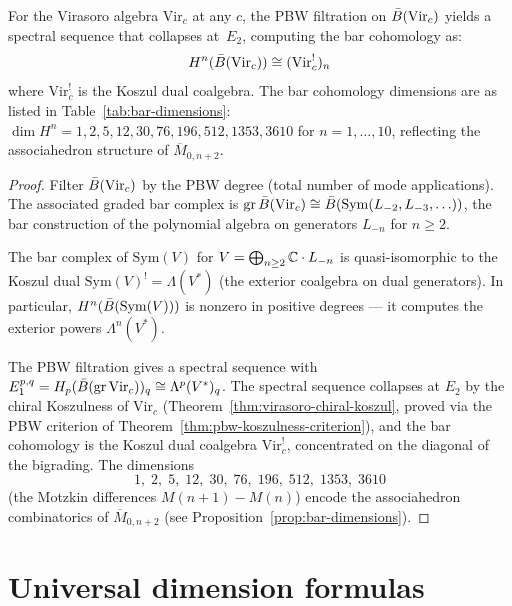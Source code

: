\begin{proposition}
\label{prop:virasoro-koszul-acyclic}
For the Virasoro algebra $\mathrm{Vir}_c$ at any $c$, the PBW filtration
on $\bar{B}(\mathrm{Vir}_c)$ yields a spectral sequence that collapses
at~$E_2$, computing the bar cohomology as:
\begin{equation}\label{eq:virasoro-koszul-acyclic}
H^n(\bar{B}(\mathrm{Vir}_c)) \cong (\mathrm{Vir}_c^!)_n
\end{equation}
where $\mathrm{Vir}_c^!$ is the Koszul dual coalgebra.
The bar cohomology dimensions are as listed in
Table~\textup{\ref{tab:bar-dimensions}}:
$\dim H^n = 1, 2, 5, 12, 30, 76, 196, 512, 1353, 3610$ for $n = 1, \ldots, 10$,
reflecting the associahedron structure of
$\overline{M}_{0,n+2}$.
\end{proposition}

\begin{proof}
Filter $\bar{B}(\mathrm{Vir}_c)$ by the PBW degree (total number
of mode applications).  The associated graded bar complex is
$\mathrm{gr}\,\bar{B}(\mathrm{Vir}_c)
\cong \bar{B}(\mathrm{Sym}(L_{-2}, L_{-3}, \ldots))$,
the bar construction of the polynomial algebra on generators
$L_{-n}$ for $n \geq 2$.

The bar complex of $\mathrm{Sym}(V)$ for $V = \bigoplus_{n \geq 2}
\mathbb{C} \cdot L_{-n}$ is quasi-isomorphic to the Koszul dual
$\mathrm{Sym}(V)^! = \Lambda(V^*)$ (the exterior coalgebra on dual
generators).  In particular, $H^n(\bar{B}(\mathrm{Sym}(V)))$ is nonzero
in positive degrees --- it computes the exterior powers $\Lambda^n(V^*)$.

The PBW filtration gives a spectral sequence with
$E_1^{p,q} = H_p(\bar{B}(\mathrm{gr}\,\mathrm{Vir}_c))_q
\cong \Lambda^p(V^*)_q$.
The spectral sequence collapses at $E_2$ by the chiral
Koszulness of $\mathrm{Vir}_c$
(Theorem~\ref{thm:virasoro-chiral-koszul}, proved via
the PBW criterion of Theorem~\ref{thm:pbw-koszulness-criterion}),
and the bar cohomology is the Koszul dual coalgebra
$\mathrm{Vir}_c^!$, concentrated on the diagonal of the bigrading.
The dimensions
\[
1,\; 2,\; 5,\; 12,\; 30,\; 76,\; 196,\; 512,\; 1353,\; 3610
\]
(the Motzkin differences $M(n{+}1) - M(n)$) encode the associahedron
combinatorics of $\overline{M}_{0,n+2}$
(see Proposition~\ref{prop:bar-dimensions}).
\end{proof}


\section{Universal dimension formulas}
\label{sec:universal-dim-formulas}

